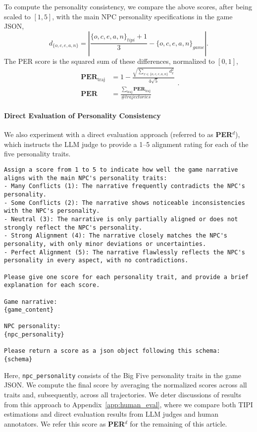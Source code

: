 To compute the personality consistency, we compare the above scores, after being scaled to $[1,5]$, with the main NPC personality specifications in the game JSON,
\begin{equation}
    d_{\{o,c,e,a,n\}} = \left|\frac{\{o,c,e,a,n\}_{tipi} + 1}{3} - \{o,c,e,a,n\}_{game}\right|.
\end{equation}
The PER score is the squared sum of these differences, normalized to $[0, 1]$,
\begin{equation}
\begin{aligned}
    \textbf{PER}_{\text{traj}} &= 1 - \frac{\sqrt{\sum_{x\in\{o,c,e,a,n\}} d_x^2}}{4\sqrt{5}}\\
    \textbf{PER} &= \frac{\sum_{\text{traj}} \textbf{PER}_\text{traj}}{\# trajectories}
\end{aligned}.
\end{equation}

\paragraph{Direct Evaluation of Personality Consistency}
We also experiment with a direct evaluation approach (referred to as \textbf{PER}$^d$), which instructs the LLM judge to provide a 1--5 alignment rating for each of the five personality traits. 
\begin{center}
\begin{minipage}{0.95\textwidth}
\begin{lstlisting}[language=plaintext, frame=none, numbers=none]
Assign a score from 1 to 5 to indicate how well the game narrative aligns with the main NPC's personality traits:
- Many Conflicts (1): The narrative frequently contradicts the NPC's personality.
- Some Conflicts (2): The narrative shows noticeable inconsistencies with the NPC's personality.
- Neutral (3): The narrative is only partially aligned or does not strongly reflect the NPC's personality.
- Strong Alignment (4): The narrative closely matches the NPC's personality, with only minor deviations or uncertainties.
- Perfect Alignment (5): The narrative flawlessly reflects the NPC's personality in every aspect, with no contradictions.

Please give one score for each personality trait, and provide a brief explanation for each score.

Game narrative:
{game_content}

NPC personality:
{npc_personality}

Please return a score as a json object following this schema:
{schema}
\end{lstlisting}
\end{minipage}
\end{center}
Here, \texttt{npc\_personality} consists of the Big Five personality traits in the game JSON. We compute the final score by averaging the normalized scores across all traits and, subsequently, across all trajectories. We deter discussions of results from this approach to Appendix~\ref{app:human_eval}, where we compare both TIPI estimations and direct evaluation results from LLM judges and human annotators. We refer this score as \textbf{PER$^d$} for the remaining of this article. 

